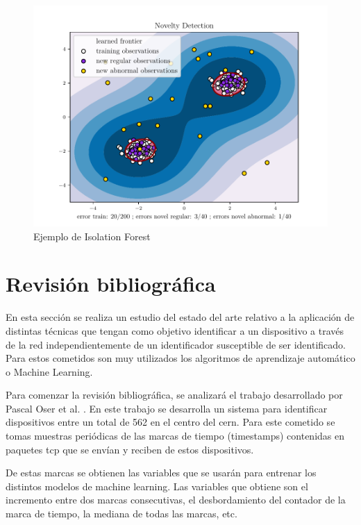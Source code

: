 \begin{figure}[htpb!]
    \centering
    \includegraphics[scale=0.7]{images/oc-svm.pdf}
    \caption{Ejemplo de Isolation Forest \cite{ex_scikit_ocsvm}}
    \label{fig:ex_scikit_ocsvm}
\end{figure}

\section{Revisión bibliográfica}

En esta sección se realiza un estudio del estado del arte relativo a la aplicación de distintas técnicas que tengan como objetivo identificar a un dispositivo a través de la red independientemente de un identificador susceptible de ser identificado. Para estos cometidos son muy utilizados los algoritmos de aprendizaje automático o Machine Learning. 

Para comenzar la revisión bibliográfica, se analizará el trabajo desarrollado por Pascal Oser et al. \cite{oser2018identifying}. En este trabajo se desarrolla un sistema para identificar dispositivos entre un total de 562 en el centro del \acrfull{cern}. Para este cometido se tomas muestras periódicas de las marcas de tiempo (timestamps) contenidas en paquetes \acrshort{tcp} que se envían y reciben de estos dispositivos.

De estas marcas se obtienen las variables que se usarán para entrenar los distintos modelos de machine learning. Las variables que obtiene son el incremento entre dos marcas consecutivas, el desbordamiento del contador de la marca de tiempo, la mediana de todas las marcas, etc.

